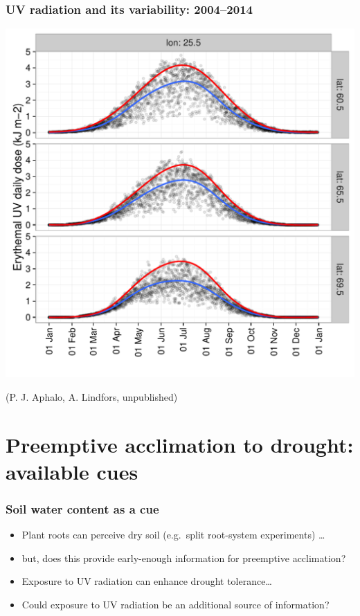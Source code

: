 \documentclass[10pt]{beamer}\usepackage[]{graphicx}\usepackage[]{xcolor}
\begin{document}
%

\begin{frame}
  \frametitle{UV radiation and its variability: 2004--2014}
  \centering
  \includegraphics[width=0.65\linewidth]{figures/fig-anders1.pdf}

  (P. J. Aphalo, A. Lindfors, unpublished)
\end{frame}

\section[Preemptive acclimation to drought: available cues]{Preemptive acclimation to drought:\\ available cues}

\begin{frame}
  \frametitle{Soil water content as a cue}
   \begin{itemize}
    \item Plant roots can perceive dry soil (e.g.\ split root-system experiments) \ldots
    \item but, does this provide early-enough information for preemptive acclimation?
    \item Exposure to UV radiation can enhance drought tolerance\ldots
    \item Could exposure to UV radiation be an additional source of information?
  \end{itemize}
\end{frame}
\end{document}
